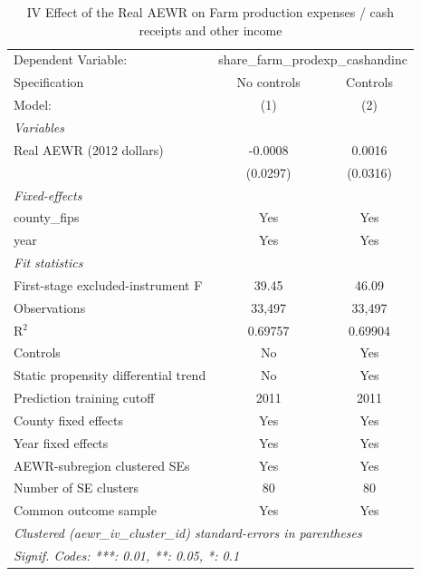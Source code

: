 
\begin{table}[htbp]
   \caption{\label{tab:iv_production_expense_share} IV Effect of the Real AEWR on Farm production expenses / cash receipts and other income}
   \centering
   \begin{tabular}{lcc}
      \tabularnewline \midrule \midrule
      Dependent Variable: & \multicolumn{2}{c}{share\_farm\_prodexp\_cashandinc}\\
      Specification                        & No controls & Controls \\
      Model:                               & (1)         & (2)\\
      \midrule
      \emph{Variables}\\
      Real AEWR (2012 dollars)             & -0.0008     & 0.0016\\
                                           & (0.0297)    & (0.0316)\\
      \midrule
      \emph{Fixed-effects}\\
      county\_fips                         & Yes         & Yes\\
      year                                 & Yes         & Yes\\
      \midrule
      \emph{Fit statistics}\\
      First-stage excluded-instrument F    & 39.45       & 46.09\\
      Observations                         & 33,497      & 33,497\\
      R$^2$                                & 0.69757     & 0.69904\\
      Controls                             & No          & Yes\\
      Static propensity differential trend & No          & Yes\\
      Prediction training cutoff           & 2011        & 2011\\
      County fixed effects                 & Yes         & Yes\\
      Year fixed effects                   & Yes         & Yes\\
      AEWR-subregion clustered SEs         & Yes         & Yes\\
      Number of SE clusters                & 80          & 80\\
      Common outcome sample                & Yes         & Yes\\
      \midrule \midrule
      \multicolumn{3}{l}{\emph{Clustered (aewr\_iv\_cluster\_id) standard-errors in parentheses}}\\
      \multicolumn{3}{l}{\emph{Signif. Codes: ***: 0.01, **: 0.05, *: 0.1}}\\
   \end{tabular}


\end{table}
